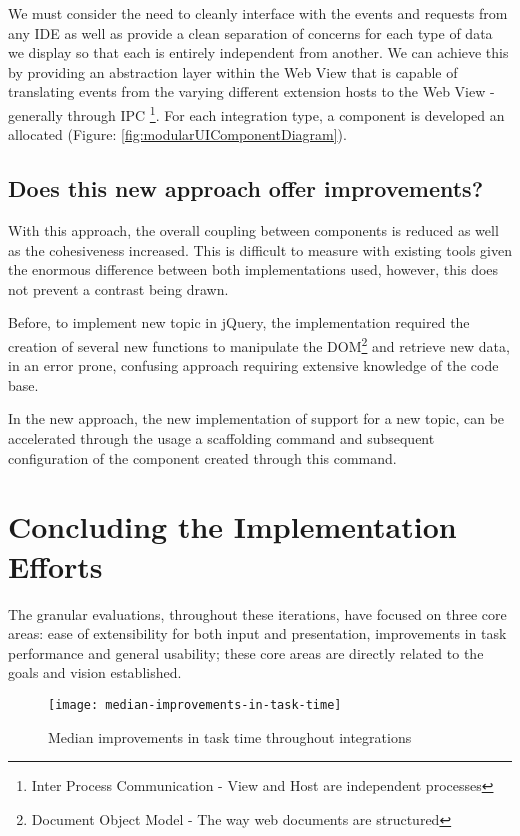 We must consider the need to cleanly interface with the events and requests from  any IDE as well as provide a clean separation of concerns for each type of data we display so that each is entirely independent from another. We can achieve this by providing an abstraction layer within the Web View that is capable of translating events from the varying different extension hosts to the Web View - generally through IPC \footnote{Inter Process Communication - View and Host are independent processes}. For each integration type, a component is developed an allocated (Figure: \ref{fig:modularUIComponentDiagram}). 

\subsection{Does this new approach offer improvements?}

With this approach, the overall coupling between components is reduced as well as the cohesiveness increased. This is difficult to measure with existing tools given the enormous difference between both implementations used, however, this does not prevent a contrast being drawn.

Before, to implement new topic in jQuery, the implementation required the creation of several new functions to manipulate the DOM\footnote{Document Object Model - The way web documents are structured} and retrieve new data, in an error prone, confusing approach requiring extensive knowledge of the code base.

In the new approach, the new implementation of support for a new topic, can be accelerated through the usage a scaffolding command and subsequent configuration of the component created through this command.

\section{Concluding the Implementation Efforts}

The granular evaluations, throughout these iterations, have focused on three core areas: ease of extensibility for both input and presentation, improvements in task performance and general usability; these core areas are directly related to the goals and vision established.

\begin{figure}[h!]
	\centering
	\texttt{[image: median-improvements-in-task-time]}
	\caption{Median improvements in task time throughout integrations}
	\label{fig:median-improvements-in-task-time}
\end{figure}


